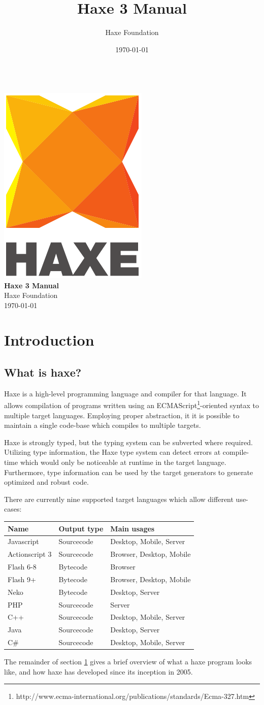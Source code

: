 \documentclass{article}
\renewcommand{\maketitle}{
   \begin{titlepage}
     \setcounter{page}{-1}
			\begin{center}
				~\\[3cm]
				\includegraphics[scale=1.25]{assets/logo.pdf}~\\[1cm]
				{\huge \bfseries Haxe 3 Manual}\\[7cm]
				Haxe Foundation\\
				\today
			\end{center}
   \end{titlepage}
}
\begin{document}
\title{Haxe 3 Manual}
\author{Haxe Foundation}
\date{\today}
\maketitle

\clearpage
\tableofcontents
\clearpage

\section{Introduction}
\label{Introduction}

\subsection{What is haxe?}

Haxe is a high-level programming language and compiler for that language. It allows compilation of programs written using an ECMAScript\footnote{http://www.ecma-international.org/publications/standards/Ecma-327.htm}-oriented syntax to multiple target languages. Employing proper abstraction, it it is possible to maintain a single code-base which compiles to multiple targets.

Haxe is strongly typed, but the typing system can be subverted where required. Utilizing type information, the Haxe type system can detect errors at compile-time which would only be noticeable at runtime in the target language. Furthermore, type information can be used by the target generators to generate optimized and robust code.

There are currently nine supported target languages which allow different use-cases:

\begin{center}
\begin{tabular}{| l | l | l |}
	\hline
	Name & Output type & Main usages \\ \hline
	Javascript & Sourcecode & Desktop, Mobile, Server \\
	Actionscript 3 & Sourcecode & Browser, Desktop, Mobile \\
	Flash 6-8 & Bytecode & Browser \\
	Flash 9+ & Bytecode & Browser, Desktop, Mobile \\ 
	Neko & Bytecode & Desktop, Server \\
	PHP & Sourcecode & Server \\
	C++ & Sourcecode & Desktop, Mobile, Server \\
	Java & Sourcecode & Desktop, Server \\
	C\# & Sourcecode & Desktop, Mobile, Server \\ \hline
\end{tabular}
\end{center}
The remainder of section \ref{Introduction} gives a brief overview of what a haxe program looks like, and how haxe has developed since its inception in 2005.
\end{document}
